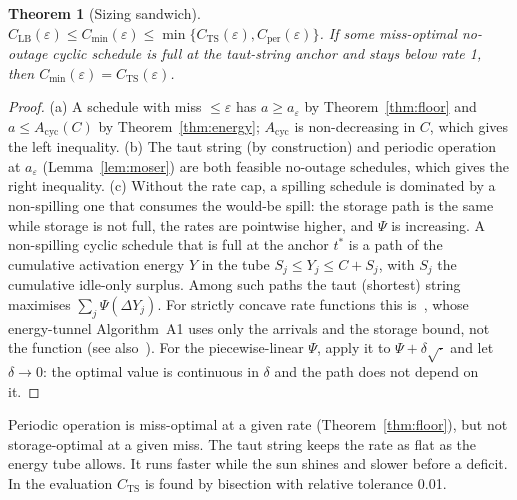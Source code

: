 \documentclass[final,5p,times,twocolumn]{elsarticle}
\newtheorem{theorem}{Theorem}
\theoremstyle{definition}
\theoremstyle{remark}
\newcommand{\eps}{\varepsilon}
\newcommand{\Psif}{\Psi}
\begin{document}
\begin{theorem}[Sizing sandwich]\label{thm:sizing}
$C_{\mathrm{LB}}(\eps)\le C_{\min}(\eps)\le\min\{C_{\mathrm{TS}}(\eps),C_{\mathrm{per}}(\eps)\}$. If some miss-optimal no-outage cyclic schedule is full at the taut-string anchor and stays below rate 1, then $C_{\min}(\eps)=C_{\mathrm{TS}}(\eps)$.
\end{theorem}
\begin{proof}
(a) A schedule with miss $\le\eps$ has $a\ge a_\eps$ by Theorem~\ref{thm:floor} and $a\le A_{\mathrm{cyc}}(C)$ by Theorem~\ref{thm:energy}; $A_{\mathrm{cyc}}$ is non-decreasing in $C$, which gives the left inequality.
(b) The taut string (by construction) and periodic operation at $a_\eps$ (Lemma~\ref{lem:moser}) are both feasible no-outage schedules, which gives the right inequality.
(c) Without the rate cap, a spilling schedule is dominated by a non-spilling one that consumes the would-be spill: the storage path is the same while storage is not full, the rates are pointwise higher, and $\Psif$ is increasing. A non-spilling cyclic schedule that is full at the anchor $t^*$ is a path of the cumulative activation energy $Y$ in the tube $S_j\le Y_j\le C+S_j$, with $S_j$ the cumulative idle-only surplus. Among such paths the taut (shortest) string maximises $\sum_j\Psif(\Delta Y_j)$. For strictly concave rate functions this is~\cite[Thm.~1]{tutuncuoglu2012twc}, whose energy-tunnel Algorithm~A1 uses only the arrivals and the storage bound, not the function (see also~\cite{yang2012tcom}). For the piecewise-linear $\Psif$, apply it to $\Psif+\delta\sqrt{\cdot}$ and let $\delta\to0$: the optimal value is continuous in $\delta$ and the path does not depend on it.
\end{proof}
\noindent Periodic operation is miss-optimal at a given rate (Theorem~\ref{thm:floor}), but not storage-optimal at a given miss. The taut string keeps the rate as flat as the energy tube allows. It runs faster while the sun shines and slower before a deficit. In the evaluation $C_{\mathrm{TS}}$ is found by bisection with relative tolerance 0.01.
\end{document}
